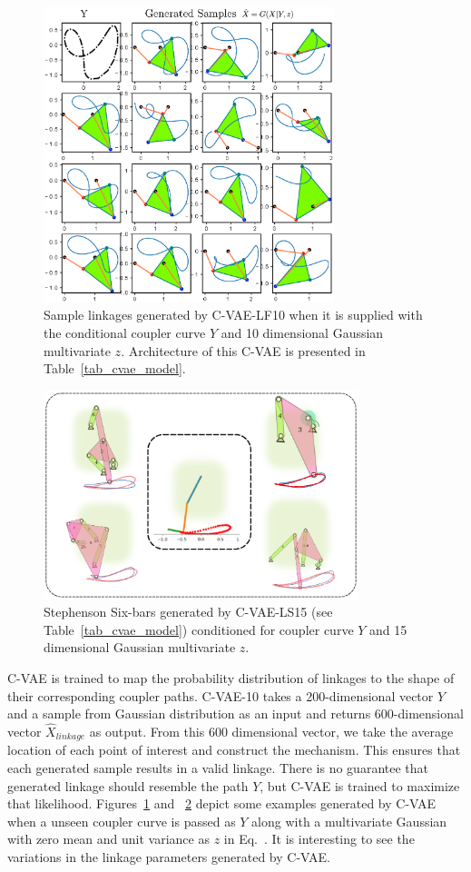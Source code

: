 \begin{figure}
\centering
\includegraphics[width=240pt]{jmd-19/figure/fig_end_to_end.eps}
  \caption{Sample linkages generated by C-VAE-LF10 when it is supplied with the conditional coupler curve $Y$ and 10 dimensional Gaussian multivariate $z$. Architecture of this C-VAE is presented in Table~\ref{tab_cvae_model}.}
\label{fig_end_to_end}
\end{figure}
\begin{figure}
\centering
\includegraphics[width=260pt]{jmd-19/figure/fig_sixbar_solutions.eps}
  \caption{Stephenson Six-bars generated by C-VAE-LS15 (see Table~\ref{tab_cvae_model}) conditioned for coupler curve $Y$ and 15 dimensional Gaussian multivariate $z$.}
\label{fig_sixbar_solutions}
\end{figure}
C-VAE is trained to map the probability distribution of linkages to the shape of their corresponding coupler paths.
C-VAE-10 takes a 200-dimensional vector $Y$ and a sample from Gaussian distribution as an input and returns 600-dimensional vector $\hat{X}_{linkage}$ as output. From this 600 dimensional vector, we take the average location of each point of interest and construct the mechanism.
This ensures that each generated sample results in a valid linkage.
There is no guarantee that generated linkage should resemble the path $Y$, but C-VAE is trained to maximize that likelihood.
Figures~\ref{fig_end_to_end} and ~\ref{fig_sixbar_solutions} depict some examples generated by C-VAE when a unseen coupler curve is passed as $Y$ along with a multivariate Gaussian with zero mean and unit variance as $z$ in Eq.~.
It is interesting to see the variations in the linkage parameters generated by C-VAE.

